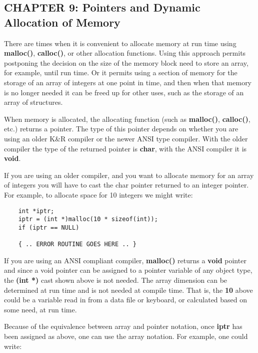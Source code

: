 \hypertarget{chapter-9-pointers-and-dynamic-allocation-of-memory}{%
\subsection{CHAPTER 9: Pointers and Dynamic Allocation of
Memory}\label{chapter-9-pointers-and-dynamic-allocation-of-memory}}

There are times when it is convenient to allocate memory at run time
using \textbf{malloc()}, \textbf{calloc()}, or other allocation
functions. Using this approach permits postponing the decision on the
size of the memory block need to store an array, for example, until run
time. Or it permits using a section of memory for the storage of an
array of integers at one point in time, and then when that memory is no
longer needed it can be freed up for other uses, such as the storage of
an array of structures.

When memory is allocated, the allocating function (such as
\textbf{malloc()}, \textbf{calloc()}, etc.) returns a pointer. The type
of this pointer depends on whether you are using an older K\&R compiler
or the newer ANSI type compiler. With the older compiler the type of the
returned pointer is \textbf{char}, with the ANSI compiler it is
\textbf{void}.

If you are using an older compiler, and you want to allocate memory for
an array of integers you will have to cast the char pointer returned to
an integer pointer. For example, to allocate space for 10 integers we
might write:

\begin{verbatim}
    int *iptr;
    iptr = (int *)malloc(10 * sizeof(int));
    if (iptr == NULL)

    { .. ERROR ROUTINE GOES HERE .. }
\end{verbatim}

If you are using an ANSI compliant compiler, \textbf{malloc()} returns a
\textbf{void} pointer and since a void pointer can be assigned to a
pointer variable of any object type, the \textbf{(int *)} cast shown
above is not needed. The array dimension can be determined at run time
and is not needed at compile time. That is, the \textbf{10} above could
be a variable read in from a data file or keyboard, or calculated based
on some need, at run time.

Because of the equivalence between array and pointer notation, once
\textbf{iptr} has been assigned as above, one can use the array
notation. For example, one could write:

